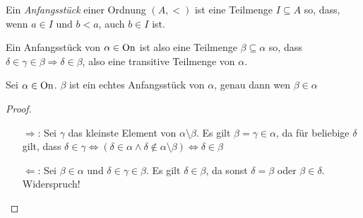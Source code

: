 \begin{definition}[Anfangsstück]
	Ein \textit{Anfangsstück} einer Ordnung $(A,<)$ ist eine Teilmenge $I\subseteq A$ so, dass, wenn $a\in I$ und $b<a$, auch $b\in I$ ist.
\end{definition}

Ein Anfangsstück von $\alpha \in \operatorname{On}$ ist also eine Teilmenge $\beta\subseteq \alpha$ so, dass $\delta\in\gamma\in \beta\Rightarrow \delta\in\beta$, also eine transitive Teilmenge von $\alpha$.

\begin{lemma}
	Sei $\alpha\in \operatorname{On}$. $\beta$ ist ein echtes Anfangsstück von $\alpha$, genau dann wen $\beta \in \alpha$
\end{lemma}
\begin{proof}
	\begin{itemize}
		\item[$\Rightarrow$:] Sei $\gamma$ das kleinste Element von $\alpha\setminus \beta$. 
		Es gilt $\beta=\gamma\in \alpha$, da für beliebige $\delta$ gilt, dass $\delta\in\gamma \Leftrightarrow (\delta\in\alpha \land \delta\notin\alpha\setminus\beta) \Leftrightarrow \delta\in\beta$
		\item[$\Leftarrow$:] Sei $\beta\in\alpha$ und $\delta\in\gamma\in\beta$. Es gilt $\delta\in\beta$, da sonst $\delta=\beta$ oder $\beta\in\delta$. Widerspruch!
	\end{itemize}
\end{proof}


